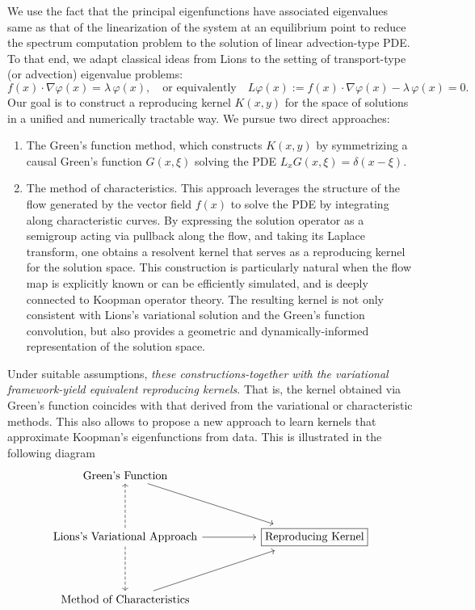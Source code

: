 \documentclass[11pt]{article}
\theoremstyle{plain}
\def\[{\begin{equation}}
\def\]{\end{equation}}
\begin{document}
We use the fact that the principal eigenfunctions have associated eigenvalues same as that of the linearization of the system at an equilibrium point to reduce the spectrum computation problem to the solution of linear advection-type PDE. 
To that end, we adapt classical ideas from Lions to the setting of transport-type (or advection) eigenvalue problems:
\[
f(x)\cdot \nabla \varphi(x)=\lambda\,\varphi(x), \quad \text{or equivalently} \quad L\varphi(x):=f(x)\cdot \nabla \varphi(x)-\lambda\, \varphi(x)=0.
\]
Our goal is to construct a reproducing kernel \(K(x,y)\) for the space of solutions in a unified and numerically tractable way. We pursue two  direct approaches:  
\begin{enumerate}
    \item The Green’s function method, which constructs \( K(x, y) \) by symmetrizing a causal Green’s function \( G(x, \xi) \) solving the PDE \( L_x G(x, \xi) = \delta(x - \xi) \). 
    \item The method of characteristics. This approach leverages the structure of the flow generated by the vector field \( f(x) \) to solve the PDE by integrating along characteristic curves. By expressing the solution operator as a semigroup acting via pullback along the flow, and taking its Laplace transform, one obtains a resolvent kernel that serves as a reproducing kernel for the solution space. This construction is particularly natural when the flow map is explicitly known or can be efficiently simulated, and is deeply connected to Koopman operator theory. The resulting kernel is not only consistent with Lions's variational solution and the Green’s function convolution, but also provides a geometric and dynamically-informed representation of the solution space.
\end{enumerate}
 

Under suitable assumptions, \emph{these constructions-together with the variational framework-yield equivalent reproducing kernels}. That is, the kernel obtained via Green’s function coincides with that derived from the variational or characteristic methods. This also allows to propose a new approach to learn kernels that approximate Koopman's eigenfunctions from data. This is illustrated in the  following diagram
 \[
\begin{tikzcd}[row sep=huge, column sep=huge]
\text{Green's Function} \arrow[dr] & \\
\text{Lions's Variational Approach} \arrow[r] \arrow[u, dashed] \arrow[d, dashed] & \boxed{\text{Reproducing Kernel}} \\
\text{Method of Characteristics} \arrow[ur] &
\end{tikzcd}
\]
\end{document}
